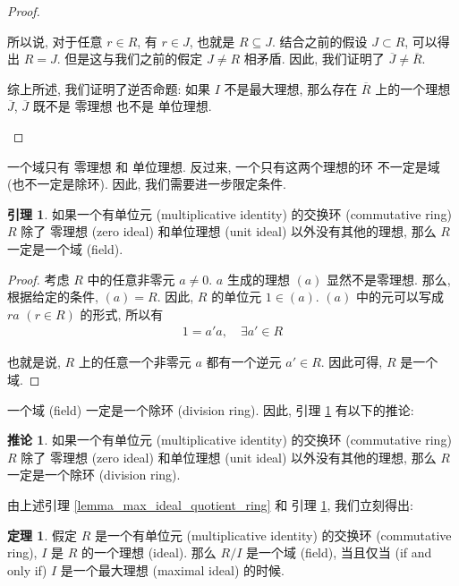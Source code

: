 \documentclass[utf8]{ctexbook}
\theoremstyle{definition}
\newtheorem{prototheorem}{定理}[section]
\newenvironment{theorem}
   {\colorlet{shadecolor}{red!30}\begin{shaded}\begin{prototheorem}}
   {\end{prototheorem}\end{shaded}}
\newtheorem{corollary}{推论}[section]
\newtheorem{lemma}{引理}[section]
\begin{document}
\begin{proof}
\begin{itemize}
{\begin{enumerate}
{所以说, 对于任意 $r \in R$, 有 $r \in J$, 也就是 $R \subseteq J$. 结合之前的假设 $J \subset R$, 可以得出 $R = J$. 但是这与我们之前的假定 $J \neq R$ 相矛盾. 因此, 我们证明了 $\overline{J} \neq \overline{R} $.}
\end{enumerate}

综上所述, 我们证明了逆否命题: 如果 $I$ 不是最大理想, 那么存在 $\overline{R}$ 上的一个理想 $\overline{J}$, $\overline{J}$ 既不是 零理想  也不是 单位理想.
}
\end{itemize}
\end{proof}

一个域只有 零理想 和 单位理想. 反过来, 一个只有这两个理想的环 不一定是域 (也不一定是除环). 因此, 我们需要进一步限定条件.

\begin{lemma}\label{lemma_max_ideal_to_field}
如果一个有单位元 (multiplicative identity) 的交换环 (commutative ring) $R$ 除了 零理想 (zero ideal) 和单位理想 (unit ideal) 以外没有其他的理想, 那么 $R$ 一定是一个域 (field).
\end{lemma}

\begin{proof}
考虑 $R$ 中的任意非零元 $a \neq 0$. $a$ 生成的理想 $(a)$ 显然不是零理想. 那么, 根据给定的条件, $(a) = R$. 因此, $R$ 的单位元 $1 \in (a)$. $(a)$ 中的元可以写成 $ra $ $(r \in R)$ 的形式, 所以有
\begin{align*}
1 = a' a, \quad \exists a' \in R
\end{align*}

也就是说, $R$ 上的任意一个非零元 $a$ 都有一个逆元 $a' \in R$. 因此可得, $R$ 是一个域.
\end{proof}

一个域 (field) 一定是一个除环 (division ring). 因此, 引理 \ref{lemma_max_ideal_to_field} 有以下的推论:
\begin{corollary}
如果一个有单位元 (multiplicative identity) 的交换环 (commutative ring) $R$ 除了 零理想 (zero ideal) 和单位理想 (unit ideal) 以外没有其他的理想, 那么 $R$ 一定是一个除环 (division ring).
\end{corollary}



由上述引理 \ref{lemma_max_ideal_quotient_ring} 和 引理 \ref{lemma_max_ideal_to_field}, 我们立刻得出:


\begin{theorem}\label{theorem_max_ideal_to_field}
假定 $R$ 是一个有单位元 (multiplicative identity) 的交换环 (commutative ring), $I$ 是 $R$ 的一个理想 (ideal). 那么 $R/I$ 是一个域 (field), 当且仅当 (if and only if) $I$ 是一个最大理想 (maximal ideal) 的时候.
\end{theorem}
\end{document}
